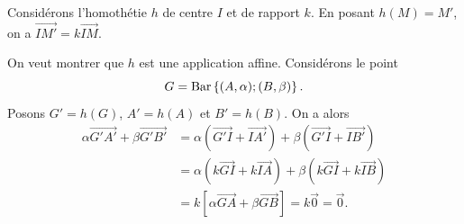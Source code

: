            \begin{ex}
                  Consid\'erons l'homoth\'etie $h$ de centre $I$ et de rapport $k$.
                  En posant $h(M) = M'$, on a $\overrightarrow{IM'} = k \overrightarrow{IM}$.
                  
                  On veut montrer que $h$ est une application affine.
                  Consid\'erons le point
                  \[
                  G = \mathrm{Bar}\left\lbrace (A,\alpha);(B,\beta) \right\rbrace.
                  \]
                  Posons $G' = h(G)$, $A' = h(A)$ et $B' = h(B)$.
                  On a alors 
                  \begin{align*}
                        \alpha \overrightarrow{G'A'} + \beta \overrightarrow{G'B'}
                              & =  \alpha (\overrightarrow{G'I} + \overrightarrow{IA'})
                                  +\beta (\overrightarrow{G'I} + \overrightarrow{IB'})      \\
                              & = \alpha (k \overrightarrow{GI} + k \overrightarrow{IA}) 
                                  +\beta (k \overrightarrow{GI} + k \overrightarrow{IB})      \\
                              & = k \left[ \alpha \overrightarrow{GA} + \beta \overrightarrow{GB} \right]       
                                = k \vec{0}      
                                = \vec{0}.
                  \end{align*}
            \end{ex}
